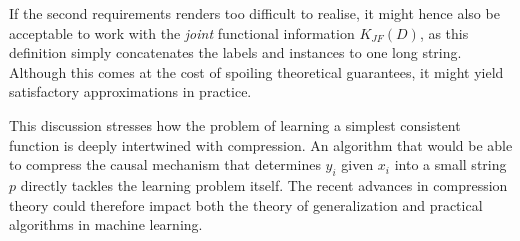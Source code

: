 If the second requirements renders too difficult to realise, it might hence also be acceptable to work with the \textit{joint} functional information $K_{JF}(D)$, as this definition simply concatenates the labels and instances to one long string.
Although this comes at the cost of spoiling theoretical guarantees, it might yield satisfactory approximations in practice.

This discussion stresses how the problem of learning a simplest consistent function is deeply intertwined with compression.
An algorithm that would be able to compress the causal mechanism that determines $y_i$ given $x_i$ into a small string $p$ directly tackles the learning problem itself.
The recent advances in compression theory \cite{campi2023compression} could therefore impact both the theory of generalization and practical algorithms in machine learning.

